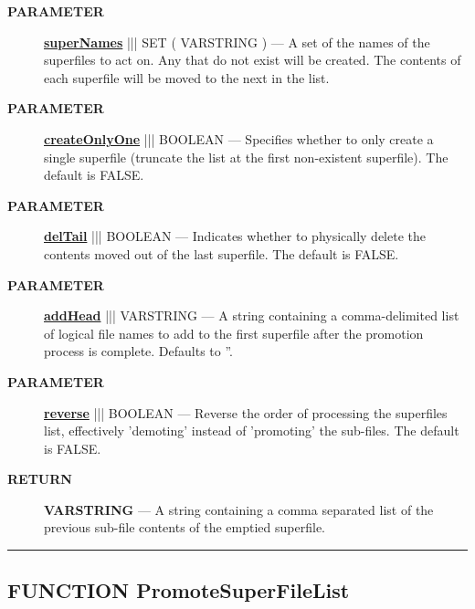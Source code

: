 \par
\begin{description}
\item [\colorbox{tagtype}{\color{white} \textbf{\textsf{PARAMETER}}}] \textbf{\underline{superNames}} ||| SET ( VARSTRING ) --- A set of the names of the superfiles to act on. Any that do not exist will be created. The contents of each superfile will be moved to the next in the list.
\item [\colorbox{tagtype}{\color{white} \textbf{\textsf{PARAMETER}}}] \textbf{\underline{createOnlyOne}} ||| BOOLEAN --- Specifies whether to only create a single superfile (truncate the list at the first non-existent superfile). The default is FALSE.
\item [\colorbox{tagtype}{\color{white} \textbf{\textsf{PARAMETER}}}] \textbf{\underline{delTail}} ||| BOOLEAN --- Indicates whether to physically delete the contents moved out of the last superfile. The default is FALSE.
\item [\colorbox{tagtype}{\color{white} \textbf{\textsf{PARAMETER}}}] \textbf{\underline{addHead}} ||| VARSTRING --- A string containing a comma-delimited list of logical file names to add to the first superfile after the promotion process is complete. Defaults to ''.
\item [\colorbox{tagtype}{\color{white} \textbf{\textsf{PARAMETER}}}] \textbf{\underline{reverse}} ||| BOOLEAN --- Reverse the order of processing the superfiles list, effectively 'demoting' instead of 'promoting' the sub-files. The default is FALSE.
\end{description}







\par
\begin{description}
\item [\colorbox{tagtype}{\color{white} \textbf{\textsf{RETURN}}}] \textbf{VARSTRING} --- A string containing a comma separated list of the previous sub-file contents of the emptied superfile.
\end{description}




\rule{\linewidth}{0.5pt}
\subsection*{\textsf{\colorbox{headtoc}{\color{white} FUNCTION}
PromoteSuperFileList}}

